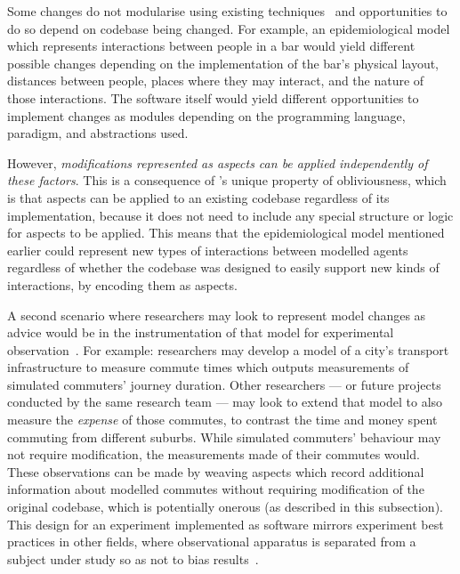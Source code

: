 Some changes do not modularise using existing
techniques~\cite{kiczales1997aspect} and opportunities to do so depend on
codebase being changed. For example, an epidemiological model which represents
interactions between people in a bar would yield different possible changes
depending on the implementation of the bar's physical layout, distances between
people, places where they may interact, and the nature of those interactions.
The software itself would yield different opportunities to implement changes as
modules depending on the programming language, paradigm, and abstractions used.

However, \emph{modifications represented as aspects can be applied independently
of these factors}. This is a consequence of \aspectorientation{}'s unique
property of obliviousness, which is that aspects can be applied to an existing
codebase regardless of its implementation, because it does not need to include
any special structure or logic for aspects to be applied\cite{filman2000aspect}.
This means that the epidemiological model mentioned earlier could represent new
types of interactions between modelled agents regardless of whether the codebase
was designed to easily support new kinds of interactions, by encoding them as
aspects.

A second scenario where researchers may look to represent model changes as
advice would be in the instrumentation of that model for experimental
observation~\cite{gulyas1999use}. For example: researchers may develop a model
of a city's transport infrastructure to measure commute times which outputs
measurements of simulated commuters' journey duration. Other researchers --- or
future projects conducted by the same research team --- may look to extend that
model to also measure the \emph{expense} of those commutes, to contrast the time
and money spent commuting from different suburbs. While simulated commuters'
behaviour may not require modification, the measurements made of their commutes
would. These observations can be made by weaving aspects which record additional
information about modelled commutes without requiring modification of the
original codebase, which is potentially onerous (as described in this
subsection). This design for an experiment implemented as software mirrors
experiment best practices in other fields, where observational apparatus is
separated from a subject under study so as not to bias
results~\cite{gulyas1999use}.

